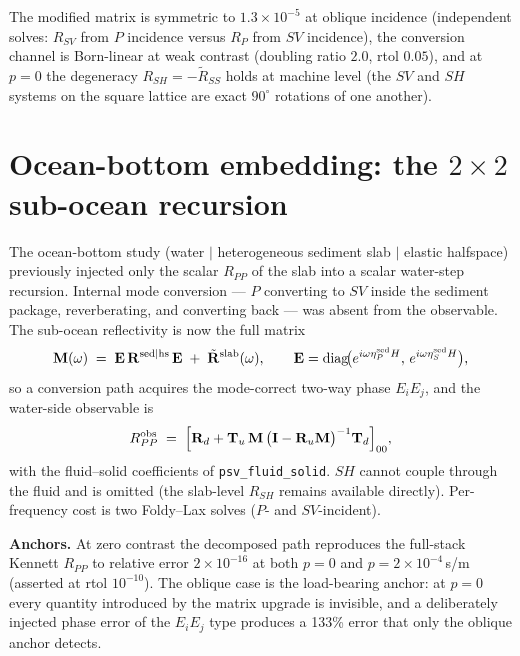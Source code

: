 \documentclass[11pt,a4paper]{article}
\newcommand{\bI}{\mathbf{I}}
\newcommand{\etaP}{\eta_{P}}
\newcommand{\etaS}{\eta_{S}}
\newcommand{\Rpsv}{\mathbf{R}}
\newcommand{\code}[1]{\texttt{#1}}
\begin{document}
The modified matrix is symmetric to $1.3\times 10^{-5}$ at oblique
incidence (independent solves: $R_{SV}$ from $P$ incidence versus $R_P$
from $SV$ incidence), the conversion channel is Born-linear at weak
contrast (doubling ratio $2.0$, rtol $0.05$), and at $p = 0$ the
degeneracy $R_{SH} = -\tilde{R}_{SS}$ holds at machine level (the $SV$
and $SH$ systems on the square lattice are exact $90^\circ$ rotations of
one another).

\section{Ocean-bottom embedding: the
  \texorpdfstring{$2\times 2$}{2x2} sub-ocean recursion}
\label{sec:ocean}

The ocean-bottom study (water $|$ heterogeneous sediment slab $|$
elastic halfspace) previously injected only the scalar $R_{PP}$ of the
slab into a scalar water-step recursion.  Internal mode conversion ---
$P$ converting to $SV$ inside the sediment package, reverberating, and
converting back --- was absent from the observable.  The sub-ocean
reflectivity is now the full matrix
\begin{equation}
  \mathbf{M}(\omega)
  \;=\;
  \mathbf{E}\,\mathbf{R}^{\rm sed|hs}\,\mathbf{E}
  \;+\;
  \tilde{\Rpsv}^{\rm slab}(\omega),
  \qquad
  \mathbf{E} = \operatorname{diag}\!\bigl(e^{i\omega\etaP^{\rm sed}H},\,
                                          e^{i\omega\etaS^{\rm sed}H}\bigr),
\end{equation}
so a conversion path acquires the mode-correct two-way phase
$E_i E_j$, and the water-side observable is
\begin{equation}
  R_{PP}^{\rm obs}
  \;=\;
  \Bigl[\mathbf{R}_d + \mathbf{T}_u\,\mathbf{M}\,
        \bigl(\bI - \mathbf{R}_u\mathbf{M}\bigr)^{-1}\mathbf{T}_d
  \Bigr]_{00},
\end{equation}
with the fluid--solid coefficients of \code{psv\_fluid\_solid}.  $SH$
cannot couple through the fluid and is omitted (the slab-level $R_{SH}$
remains available directly).  Per-frequency cost is two Foldy--Lax
solves ($P$- and $SV$-incident).

\textbf{Anchors.}  At zero contrast the decomposed path reproduces the
full-stack Kennett $R_{PP}$ to relative error $2\times 10^{-16}$ at both
$p = 0$ and $p = 2\times 10^{-4}$\,s/m (asserted at rtol $10^{-10}$).
The oblique case is the load-bearing anchor: at $p=0$ every quantity
introduced by the matrix upgrade is invisible, and a deliberately
injected phase error of the $E_iE_j$ type produces a 133\% error that
only the oblique anchor detects.
\end{document}
